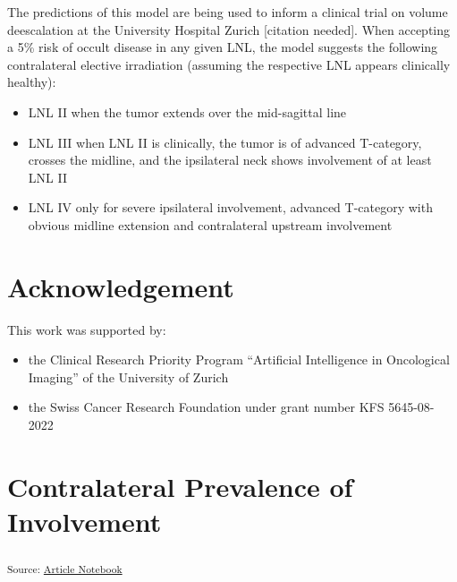 \documentclass[
  sn-mathphys-num,
]{sn-jnl}
\providecommand{\tightlist}{%
  \setlength{\itemsep}{0pt}\setlength{\parskip}{0pt}}\usepackage{longtable,booktabs,array}
\begin{document}
The predictions of this model are being used to inform a clinical trial
on volume deescalation at the University Hospital Zurich {[}citation
needed{]}. When accepting a 5\% risk of occult disease in any given LNL,
the model suggests the following contralateral elective irradiation
(assuming the respective LNL appears clinically healthy):

\begin{itemize}
\tightlist
\item
  LNL II when the tumor extends over the mid-sagittal line
\item
  LNL III when LNL II is clinically, the tumor is of advanced
  T-category, crosses the midline, and the ipsilateral neck shows
  involvement of at least LNL II
\item
  LNL IV only for severe ipsilateral involvement, advanced T-category
  with obvious midline extension and contralateral upstream involvement
\end{itemize}

\section{Acknowledgement}\label{acknowledgement}

This work was supported by:

\begin{itemize}
\tightlist
\item
  the Clinical Research Priority Program ``Artificial Intelligence in
  Oncological Imaging'' of the University of Zurich
\item
  the Swiss Cancer Research Foundation under grant number KFS
  5645-08-2022
\end{itemize}

\section{Contralateral Prevalence of
Involvement}\label{contralateral-prevalence-of-involvement}

\textsubscript{Source:
\href{https://rmnldwg.github.io/bilateral-paper/manuscript-preview.html}{Article
Notebook}}
\end{document}
